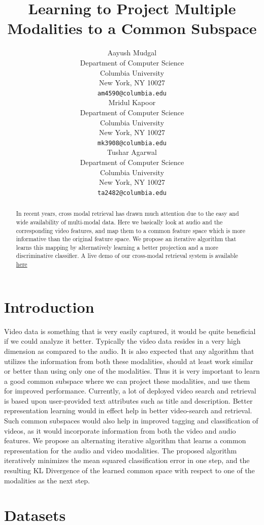 \documentclass{article}
\title{Learning to Project Multiple Modalities to a Common Subspace}
\author{
Aayush Mudgal \\
  Department of Computer Science\\
  Columbia University\\
  New York, NY 10027 \\
  \texttt{am4590@columbia.edu} \\
  \And
  Mridul Kapoor \\
  Department of Computer Science\\
  Columbia University\\
  New York, NY 10027 \\
  \texttt{mk3908@columbia.edu} \\
  \AND
  Tushar Agarwal\\
  Department of Computer Science\\
  Columbia University\\
  New York, NY 10027 \\
  \texttt{ta2482@columbia.edu} \\
}
\begin{document}

\maketitle

\begin{abstract}
In recent years, cross modal retrieval has drawn much attention due to the easy and wide availability of multi-modal data. Here we basically look at audio and the corresponding video features, and map them to a common feature space which is more informative than the original feature space. We propose an iterative algorithm that learns this mapping by alternatively learning a better projection and a more discriminative classifier. A live demo of our cross-modal retrieval system is available \href{http://audioset.herokuapp.com/}{here}
\end{abstract}

\section{Introduction}

Video data is something that is very easily captured, it would be quite beneficial if we could analyze it better. Typically the video data resides in a very high dimension as compared to the audio. It is also expected that any algorithm that utilizes the information from both these modalities, should at least work similar or better than using only one of the modalities. Thus it is very important to learn a good common subspace where we can project these modalities, and use them for improved performance. Currently, a lot of deployed video search and retrieval is based upon user-provided text attributes such as title and description. Better representation learning would in effect help in better video-search and retrieval. Such common subspaces would also help in improved tagging and classification of videos, as it would incorporate information from both the video and audio features. We propose an alternating iterative algorithm that learns a common representation for the audio and video modalities. The proposed algorithm iteratively minimizes the mean squared classification error in one step, and the resulting KL Divergence of the learned common space with respect to  one of the modalities as the next step.

\section{Datasets}
\end{document}
